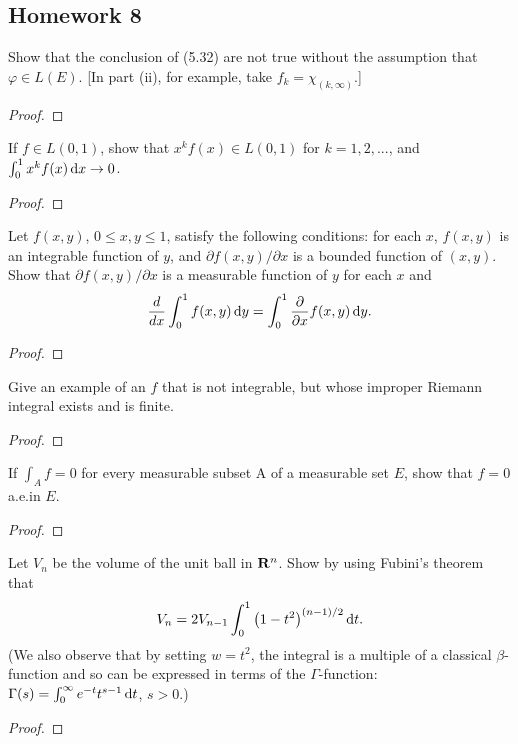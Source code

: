 \subsection{Homework 8}
\begin{problem}
Show that the conclusion of (5.32) are not true without the assumption that
$\varphi\in L(E)$. [In part (ii), for example, take $f_k=\chi_{(k,\infty)}$.]
\end{problem}
\begin{proof}
\end{proof}

\begin{problem}
If $f\in L(0,1)$, show that $x^kf(x)\in L(0,1)$ for $k=1,2,...$, and
$\int_0^1 x^kf(x)\mathop{}\!\mathrm{d} x\to 0$.
\end{problem}
\begin{proof}
\end{proof}

\begin{problem}
Let $f(x,y)$, $0\leq x,y\leq 1$, satisfy the following conditions: for each
$x$, $f(x,y)$ is an integrable function of $y$, and
$\partial f(x,y)/\partial x$ is a bounded function of $(x,y)$. Show that
$\partial f(x,y)/\partial x$ is a measurable function of $y$ for each $x$
and
\[
\frac{d}{dx}\int_0^1f(x,y)\mathop{}\!\mathrm{d} y=\int_0^1\frac{\partial}{\partial x}f(x,y)\mathop{}\!\mathrm{d} y.
\]
\end{problem}
\begin{proof}
\end{proof}

\begin{problem}
Give an example of an $f$ that is not integrable, but whose improper
Riemann integral exists and is finite.
\end{problem}
\begin{proof}
\end{proof}

\begin{problem}
If $\int_A f=0$ for every measurable subset A of a measurable set $E$, show
that $f=0$ a.e.\@ in $E$.
\end{problem}
\begin{proof}
\end{proof}

\begin{problem}
 Let $V_n$ be the volume of the unit ball in $\mathbf{R}^n$. Show by using
 Fubini's theorem that
\[
V_n=2V_{n-1}\int_0^1\left(1-t^2\right)^{(n-1)/2}\mathop{}\!\mathrm{d} t.
\]
(We also observe that by setting $w=t^2$, the integral is a multiple of a
classical $\beta$-function and so can be expressed in terms of the
$\Gamma$-function: $\Gamma(s)=\int_0^\infty e^{-t}t^{s-1}\mathop{}\!\mathrm{d} t$, $s>0$.)
\end{problem}
\begin{proof}
\end{proof}

